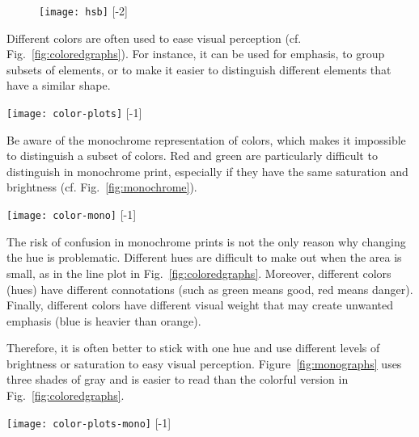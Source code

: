 \begin{figure}
\centering
\texttt{[image: hsb]}
[-2\baselineskip]
\end{figure}

Different colors are often used to ease visual perception (cf. Fig.~\ref{fig:coloredgraphs}). For instance, it can be used for emphasis, to group subsets of elements, or to make it easier to distinguish different elements that have a similar shape.

\begin{marginfigure}
\centering
\texttt{[image: color-plots]}
[-1\baselineskip]
\end{marginfigure}


Be aware of the monochrome representation of colors, which makes it impossible to distinguish a subset of colors. Red and green are particularly difficult to distinguish in monochrome print, especially if they have the same saturation and brightness (cf. Fig.~\ref{fig:monochrome}).

\begin{marginfigure}
\centering
\texttt{[image: color-mono]}
[-1\baselineskip]
\end{marginfigure}

The risk of confusion in monochrome prints is not the only reason why changing the hue is problematic. Different hues are difficult to make out when the area is small, as in the line plot in  Fig.~\ref{fig:coloredgraphs}. Moreover, different colors (hues) have different connotations (such as green means good, red means danger). Finally, different colors have different visual weight that may create unwanted emphasis (blue is heavier than orange).

Therefore, it is often better to stick with one hue and use different levels of brightness or saturation to easy visual perception. Figure~\ref{fig:monographs} uses three shades of gray and is easier to read than the colorful version in Fig.~\ref{fig:coloredgraphs}.


\begin{marginfigure}
\centering
\texttt{[image: color-plots-mono]}
[-1\baselineskip]
\end{marginfigure}

